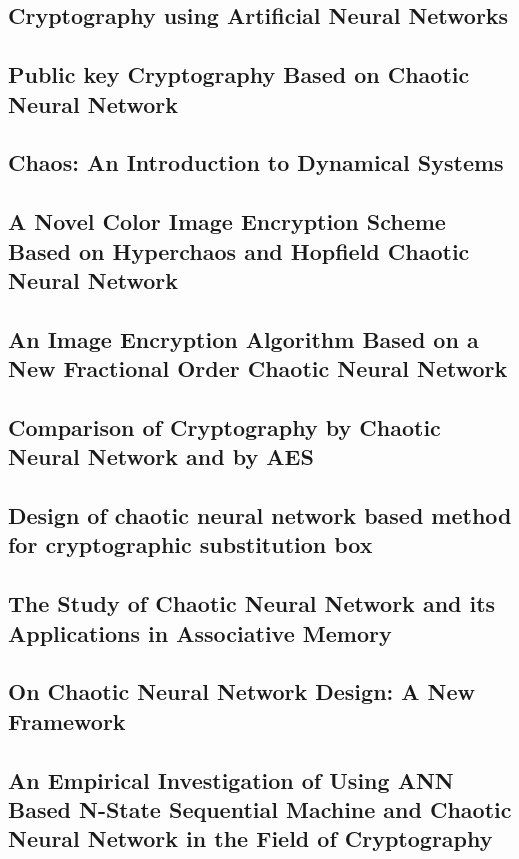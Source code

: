 \documentclass[conference]{IEEEtran}
\begin{document}
\subsection{Cryptography using Artificial Neural Networks}\cite{Gujral}
\subsection{Public key Cryptography Based on Chaotic Neural Network}\cite{Hamdy}
\subsection{Chaos: An Introduction to Dynamical Systems}\cite{Alligood}
\subsection{A Novel Color Image Encryption Scheme Based on Hyperchaos and Hopfield Chaotic Neural Network}\cite{Wu2022}
\subsection{An Image Encryption Algorithm Based on a New Fractional Order Chaotic Neural Network}\cite{Li2022}
\subsection{Comparison of Cryptography by Chaotic Neural Network and by AES}\cite{Skovajsova2019}
\subsection{Design of chaotic neural network based method for cryptographic substitution box}\cite{Ahmad2016}
\subsection{The Study of Chaotic Neural Network and its Applications in Associative Memory}\cite{He1999}
\subsection{On Chaotic Neural Network Design: A New Framework}\cite{Qin2017}
\subsection{An Empirical Investigation of Using ANN Based N-State Sequential Machine and Chaotic Neural Network in the Field of Cryptography}\cite{Shukla2012}
\end{document}
